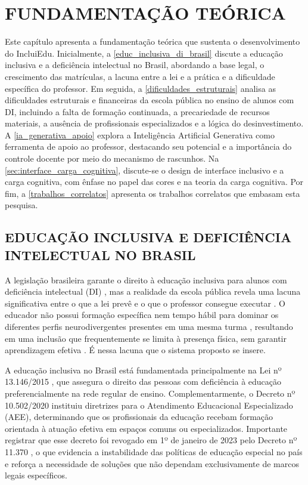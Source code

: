 %
%

\chapter{FUNDAMENTAÇÃO TEÓRICA}\label{chap:fundamentacao}

Este capítulo apresenta a fundamentação teórica que sustenta o desenvolvimento do IncluiEdu. Inicialmente, a \autoref{educ_inclusiva_di_brasil} discute a educação inclusiva e a deficiência intelectual no Brasil, abordando a base legal, o crescimento das matrículas, a lacuna entre a lei e a prática e a dificuldade específica do professor. Em seguida, a \autoref{dificuldades_estruturais} analisa as dificuldades estruturais e financeiras da escola pública no ensino de alunos com DI, incluindo a falta de formação continuada, a precariedade de recursos materiais, a ausência de profissionais especializados e a lógica do desinvestimento. A \autoref{ia_generativa_apoio} explora a Inteligência Artificial Generativa como ferramenta de apoio ao professor, destacando seu potencial e a importância do controle docente por meio do mecanismo de rascunhos. Na \autoref{sec:interface_carga_cognitiva}, discute-se o design de interface inclusivo e a carga cognitiva, com ênfase no papel das cores e na teoria da carga cognitiva. Por fim, a \autoref{trabalhos_correlatos} apresenta os trabalhos correlatos que embasam esta pesquisa.

\section{EDUCAÇÃO INCLUSIVA E DEFICIÊNCIA INTELECTUAL NO BRASIL}
\label{educ_inclusiva_di_brasil}

A legislação brasileira garante o direito à educação inclusiva para alunos com deficiência intelectual (DI) \cite{brasil2015lbi}, mas a realidade da escola pública revela uma lacuna significativa entre o que a lei prevê e o que o professor consegue executar \cite{souza2025acessibilidade}. O educador não possui formação específica nem tempo hábil para dominar os diferentes perfis neurodivergentes presentes em uma mesma turma \cite{irm2026panorama}, resultando em uma inclusão que frequentemente se limita à presença física, sem garantir aprendizagem efetiva \cite{oliveira2025escolas}. É nessa lacuna que o sistema proposto se insere.

A educação inclusiva no Brasil está fundamentada principalmente na Lei nº 13.146/2015 \cite{brasil2015lbi}, que assegura o direito das pessoas com deficiência à educação preferencialmente na rede regular de ensino. Complementarmente, o Decreto nº 10.502/2020 \cite{brasil2020pnee} instituiu diretrizes para o Atendimento Educacional Especializado (AEE), determinando que os profissionais da educação recebam formação orientada à atuação efetiva em espaços comuns ou especializados. Importante registrar que esse decreto foi revogado em 1º de janeiro de 2023 pelo Decreto nº 11.370 \cite{brasil2023revogacao}, o que evidencia a instabilidade das políticas de educação especial no país e reforça a necessidade de soluções que não dependam exclusivamente de marcos legais específicos.

